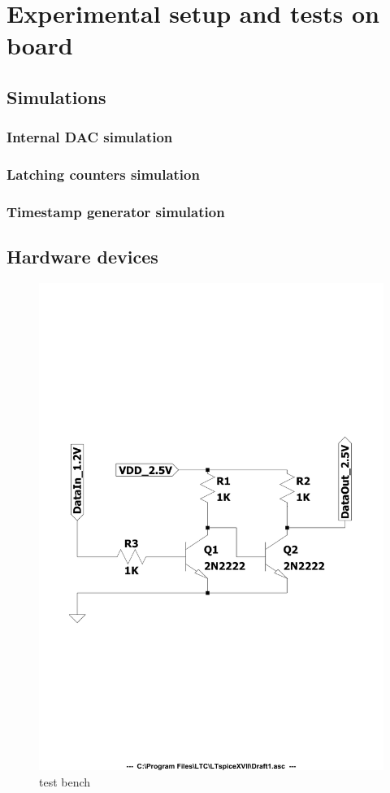 \chapter{Experimental setup and tests on board}

\section{Simulations}

\subsection{Internal DAC simulation}\label{dactests}

\subsection{Latching counters simulation}

\subsection{Timestamp generator simulation}

\section{Hardware devices}\label{hardware}

\begin{figure}[H]
	\centering
	\includegraphics[width=0.7\linewidth]{IMG/ch5/DIAGRAM}
	\caption{test bench}
	\label{fig:diagram}
\end{figure}



